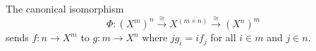 The canonical isomorphism
$$
\Phi: (X^m)^n \xrightarrow{\cong} X^{(m \times n)} \xrightarrow{\cong} (X^n)^m
$$
sends $f: n \to X^m$ to $g: m \to X^n$ where $j g_i = i f_j$ for all $i \in m$ and $j \in n$.
